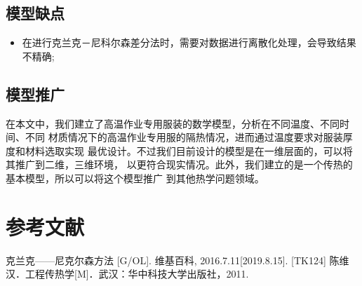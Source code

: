 \documentclass{cumcmthesis}
\begin{document}
    \subsection{模型缺点}
        \begin{itemize}
            \item 在进行克兰克－尼科尔森差分法时，需要对数据进行离散化处理，会导致结果不精确;
        \end{itemize}
    \subsection{模型推广}
        在本文中，我们建立了高温作业专用服装的数学模型，分析在不同温度、不同时间、不同
        材质情况下的高温作业专用服的隔热情况，进而通过温度要求对服装厚度和材料选取实现
        最优设计。不过我们目前设计的模型是在一维层面的，可以将其推广到二维，三维环境，
        以更符合现实情况。此外，我们建立的是一个传热的基本模型，所以可以将这个模型推广
        到其他热学问题领域。
\section{参考文献}


\begin{thebibliography}{9}%
  克兰克——尼克尔森方法 [G/OL]. 维基百科, 2016.7.11[2019.8.15].
  [TK124] 陈维汉．工程传热学[M]．武汉：华中科技大学出版社，2011.
\end{thebibliography}
\end{document}
